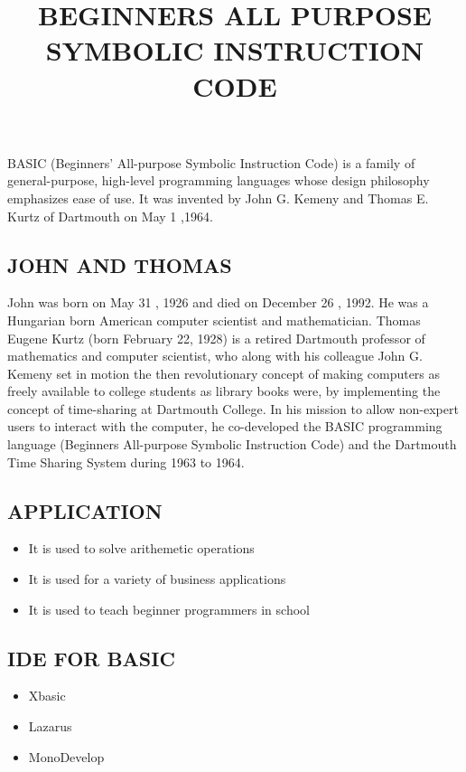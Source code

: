 \documentclass{article}
\title{BEGINNERS ALL PURPOSE SYMBOLIC INSTRUCTION CODE}
\begin{document}
	\maketitle
	BASIC (Beginners' All-purpose Symbolic Instruction Code) is a family of general-purpose, high-level programming languages whose design philosophy emphasizes ease of use. 
	It was invented by John G. Kemeny and Thomas E. Kurtz of Dartmouth on May 1 ,1964.
	
	\subsection{JOHN AND THOMAS}
	John was born on May 31 , 1926 and died on December 26 , 1992. He was a Hungarian born American computer scientist and mathematician.
	Thomas Eugene Kurtz (born February 22, 1928) is a retired Dartmouth professor of mathematics and computer scientist, who along with his colleague John G. Kemeny set in motion the then revolutionary concept of making computers as freely available to college students as library books were, by implementing the concept of time-sharing at Dartmouth College. In his mission to allow non-expert users to interact with the computer, he co-developed the BASIC programming language (Beginners All-purpose Symbolic Instruction Code) and the Dartmouth Time Sharing System during 1963 to 1964.
	
	\subsection{APPLICATION}
	\begin{itemize}
		\item It is used to solve arithemetic operations
		\item It is used for a variety of business applications
		\item It is used to teach beginner programmers in school 
	\end{itemize}

\subsection{IDE FOR BASIC}
\begin{itemize}
	\item Xbasic
	\item Lazarus
	\item MonoDevelop
	\end{itemize}
\end{document}
